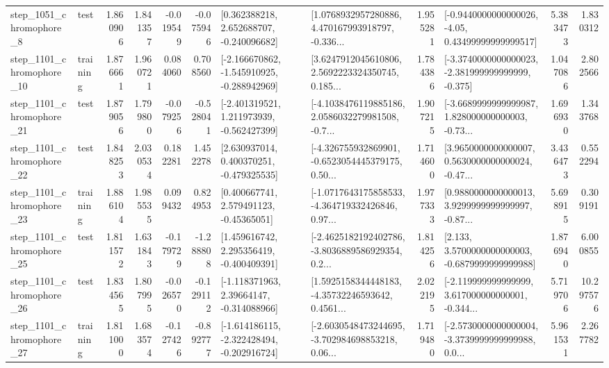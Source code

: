 \begin{tabular}{llrrrrllrlrr}
  step\_1051\_chromophore\_8 &      test &      1.860906 &    1.841357 &     -0.019549 & -0.075946 &    [0.362388218, 2.652688707, -0.240096682] &  [1.0768932957280886, 4.470167993918797, -0.336... &       1.955281 &  [-0.9440000000000026, -4.05, 0.43499999999999517] &            5.383473 &          1.830312 \\
 step\_1101\_chromophore\_10 &  training &      1.876661 &    1.960721 &      0.084060 &  0.708560 &  [-2.166670862, -1.545910925, -0.288942969] &  [3.6247912045610806, 2.5692223324350745, 0.185... &       1.784386 &  [-3.3740000000000023, -2.381999999999999, -0.375] &            1.047086 &          2.802566 \\
 step\_1101\_chromophore\_21 &      test &      1.879056 &    1.799800 &     -0.079256 & -0.528041 &   [-2.401319521, 1.211973939, -0.562427399] &  [-4.1038476119885186, 2.0586032279981508, -0.7... &       1.907215 &  [-3.6689999999999987, 1.828000000000003, -0.73... &            1.696930 &          1.343768 \\
 step\_1101\_chromophore\_22 &      test &      1.848253 &    2.030534 &      0.182281 &  1.452278 &    [2.630937014, 0.400370251, -0.479325535] &  [-4.326755932869901, -0.6523054445379175, 0.50... &       1.714600 &  [3.9650000000000007, 0.5630000000000024, -0.47... &            3.436473 &          0.552294 \\
 step\_1101\_chromophore\_23 &  training &      1.886104 &    1.985535 &      0.099432 &  0.824953 &     [0.400667741, 2.579491123, -0.45365051] &  [-1.0717643175858533, -4.364719332426846, 0.97... &       1.977333 &  [0.9880000000000013, 3.9299999999999997, -0.87... &            5.698915 &          0.309191 \\
 step\_1101\_chromophore\_25 &      test &      1.811572 &    1.631843 &     -0.179729 & -1.288808 &    [1.459616742, 2.295356419, -0.400409391] &  [-2.4625182192402786, -3.8036889586929354, 0.2... &       1.814256 &   [2.133, 3.5700000000000003, -0.6879999999999988] &            1.876940 &          6.000855 \\
 step\_1101\_chromophore\_26 &      test &      1.834565 &    1.807995 &     -0.026570 & -0.129112 &    [-1.118371963, 2.39664147, -0.314088966] &  [1.5925158344448183, -4.35732246593642, 0.4561... &       2.022195 &  [-2.119999999999999, 3.617000000000001, -0.344... &            5.719706 &         10.297576 \\
 step\_1101\_chromophore\_27 &  training &      1.811000 &    1.683574 &     -0.127426 & -0.892777 &  [-1.614186115, -2.322428494, -0.202916724] &  [-2.6030548473244695, -3.702984698853218, 0.06... &       1.719480 &  [-2.5730000000000004, -3.3739999999999988, 0.0... &            5.961531 &          2.267782 \\

\end{tabular}
